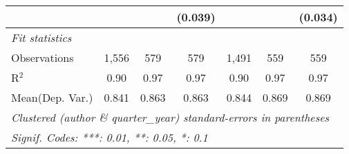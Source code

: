 \begin{tabular}{lcccccc}
                           &             &         & (0.039) &             &              & (0.034)\\   
   \midrule
   \emph{Fit statistics}\\
   Observations            & 1,556       & 579     & 579     & 1,491       & 559          & 559\\  
   R$^2$                   & 0.90        & 0.97    & 0.97    & 0.90        & 0.97         & 0.97\\  
Mean(Dep. Var.) & 0.841 & 0.863 & 0.863 & 0.844 & 0.869 & 0.869 \\
   \midrule \midrule
   \multicolumn{7}{l}{\emph{Clustered (author \& quarter\_year) standard-errors in parentheses}}\\
   \multicolumn{7}{l}{\emph{Signif. Codes: ***: 0.01, **: 0.05, *: 0.1}}\\
\end{tabular}
\par\endgroup
